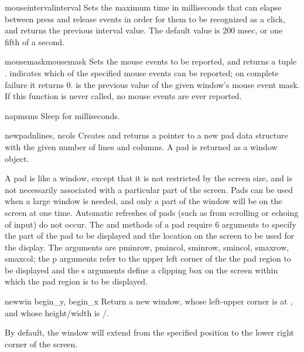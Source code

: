 \begin{funcdesc}{mouseinterval}{interval}
Sets the maximum time in milliseconds that can elapse between press and
release events in order for them to be recognized as a click, and
returns the previous interval value.  The default value is 200 msec,
or one fifth of a second.
\end{funcdesc}

\begin{funcdesc}{mousemask}{mousemask}
Sets the mouse events to be reported, and returns a tuple
.  
 indicates which of the
specified mouse events can be reported; on complete failure it returns
0.   is the previous value of the given window's mouse
event mask.  If this function is never called, no mouse events are
ever reported.
\end{funcdesc}

\begin{funcdesc}{napms}{ms}
Sleep for  milliseconds.
\end{funcdesc}

\begin{funcdesc}{newpad}{nlines, ncols}
Creates and returns a pointer to a new pad data structure with the
given number of lines and columns.  A pad is returned as a
window object.

A pad is like a window, except that it is not restricted by the screen
size, and is not necessarily associated with a particular part of the
screen.  Pads can be used when a large window is needed, and only a
part of the window will be on the screen at one time.  Automatic
refreshes of pads (such as from scrolling or echoing of input) do not
occur.  The  and  methods of a
pad require 6 arguments to specify the part of the pad to be
displayed and the location on the screen to be used for the display.
The arguments are pminrow, pmincol, sminrow, smincol, smaxrow,
smaxcol; the p arguments refer to the upper left corner of the the pad
region to be displayed and the s arguments define a clipping box on
the screen within which the pad region is to be displayed.
\end{funcdesc}

\begin{funcdesc}{newwin}{ begin_y, begin_x}
Return a new window, whose left-upper corner is at 
, and whose height/width is 
/.  

By default, the window will extend from the 
specified position to the lower right corner of the screen.
\end{funcdesc}

